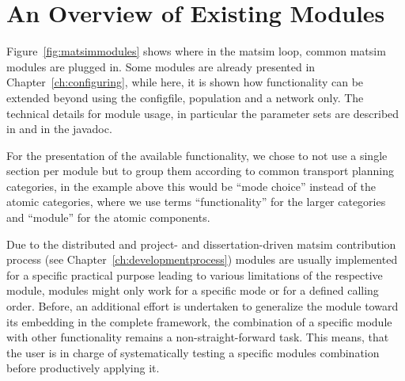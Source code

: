 
\section{An Overview of Existing Modules}
Figure~\ref{fig:matsimmodules} shows where in the \gls{matsim} loop, common \gls{matsim} modules are plugged in. Some modules are already presented in Chapter~\ref{ch:configuring}, while here, it is shown how functionality can be extended beyond using the \gls{configfile}, population and a network only. The technical details for module usage, in particular the parameter sets are described in \citep[][]{MATSim_Userguide_2015} and in the \gls{javadoc}.

For the presentation of the available functionality, we chose to not use a single section per module but to group them according to common transport planning categories, in the example above this would be ``mode choice'' instead of the atomic categories, where we use terms ``functionality'' for the larger categories and ``module'' for the atomic components. %

Due to the distributed and project- and dissertation-driven \gls{matsim} contribution process (see Chapter~\ref{ch:developmentprocess}) modules are usually implemented for a specific practical purpose leading to various limitations of the respective module, \eg modules might only work for a specific mode or for a defined calling order. Before, an additional effort is undertaken to generalize the module toward its embedding in the complete framework, the combination of a specific module with other functionality remains a non-straight-forward task. This means, that the user is in charge of systematically testing a specific modules combination before productively applying it.

